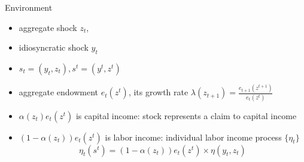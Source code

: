 \documentclass[9pt]{beamer}
\theoremstyle{mystyle}
\begin{document}
\begin{frame}{Environment}
\begin{itemize}%
\item aggregate shock $z_t$, 
\vspace{5mm}
\item idiosyncratic shock $y_t$
\vspace{5mm}
\item  $s_t = (y_t,z_t),  s^t = (y^t,z^t)$
\vspace{5mm}
\item aggregate endowment $e_t(z^t)$, its growth rate $\lambda(z_{t+1}) = \frac{e_{t+1}(z^{t+1})}{e_{t}(z^{t})}$

\vspace{5mm}
\item $\alpha(z_t)e_t(z^t)$ is capital income: stock represents a claim to capital income
\vspace{5mm}
\item $(1-\alpha(z_t))e_t(z^t)$ is labor income: individual labor income process $\{\eta_t\}$
\begin{equation*}
\eta_t(s^t) = (1-\alpha(z_t))e_t(z^t) \times \eta(y_t, z_t)
\end{equation*}
\end{itemize}
\end{frame}

\end{document}
